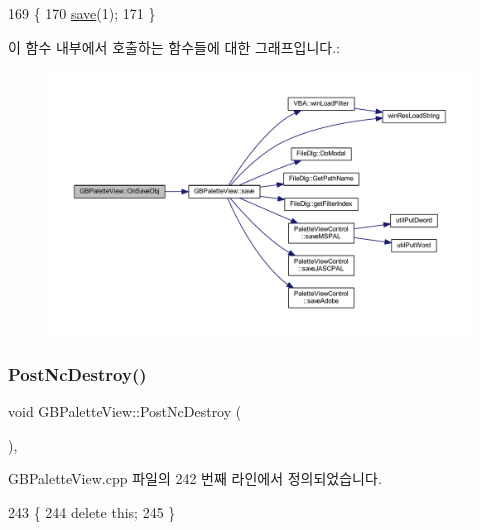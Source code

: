 \begin{DoxyCode}
169 \{
170   \mbox{\hyperlink{class_g_b_palette_view_a90cca0ba09442c669f7403d31e8ab0ee}{save}}(1);
171 \}
\end{DoxyCode}
이 함수 내부에서 호출하는 함수들에 대한 그래프입니다.\+:
\nopagebreak
\begin{figure}[H]
\begin{center}
\leavevmode
\includegraphics[width=350pt]{class_g_b_palette_view_a20eb0c24604804e9c33db15f3ff394f0_cgraph}
\end{center}
\end{figure}
\mbox{\label{class_g_b_palette_view_a076a96cf195fe071e3050704636247ff}} 
\subsubsection{\texorpdfstring{Post\+Nc\+Destroy()}{PostNcDestroy()}}
{\footnotesize\ttfamily void G\+B\+Palette\+View\+::\+Post\+Nc\+Destroy (\begin{DoxyParamCaption}{ }\end{DoxyParamCaption})\hspace{0.3cm}{\ttfamily [protected]}, {\ttfamily [virtual]}}



G\+B\+Palette\+View.\+cpp 파일의 242 번째 라인에서 정의되었습니다.


\begin{DoxyCode}
243 \{
244   \textcolor{keyword}{delete} \textcolor{keyword}{this};
245 \}
\end{DoxyCode}
\mbox{\label{class_g_b_palette_view_a90cca0ba09442c669f7403d31e8ab0ee}} 
